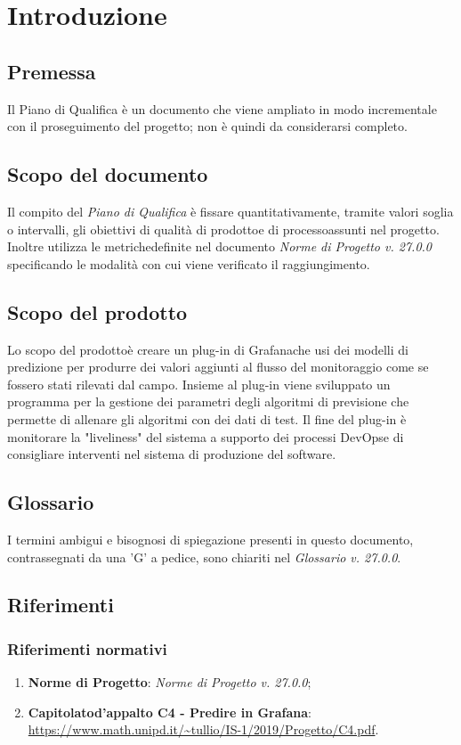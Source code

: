 \section{Introduzione}
	\subsection{Premessa}
	Il Piano di Qualifica è un documento che viene ampliato in modo incrementale con il proseguimento del progetto\glo; non è quindi da considerarsi completo.
	
	\subsection{Scopo del documento}
	Il compito del \textit{Piano di Qualifica} è fissare quantitativamente, tramite valori soglia o intervalli, gli obiettivi di qualità di prodotto\glosp e di processo\glosp assunti nel progetto\glo. Inoltre utilizza le metriche\glosp definite nel documento \textit{Norme di Progetto v. 27.0.0} specificando le modalità con cui viene verificato il raggiungimento.

	\subsection{Scopo del prodotto}
	Lo scopo del prodotto\glosp è creare un plug-in di Grafana\glosp che usi dei modelli di predizione per produrre dei valori aggiunti al flusso del monitoraggio come se fossero stati rilevati dal campo. Insieme al plug-in viene sviluppato un programma per la gestione dei parametri degli algoritmi di previsione che permette di allenare gli algoritmi con dei dati di test. Il fine del plug-in è monitorare la "liveliness" del sistema a supporto dei processi DevOps\glosp e di consigliare interventi nel sistema di produzione del software.
	
	\subsection{Glossario}
	I termini ambigui e bisognosi di spiegazione presenti in questo documento, contrassegnati da una 'G' a pedice, sono chiariti nel \textit{Glossario v. 27.0.0}.
	
	\subsection{Riferimenti}
		\subsubsection{Riferimenti normativi}
		\begin{enumerate}
			\item \textbf{Norme di Progetto}: \textit{Norme di Progetto v. 27.0.0};
			\item \textbf{Capitolato}\glosp \textbf{d'appalto C4 - Predire in Grafana}\glo: \url{https://www.math.unipd.it/~tullio/IS-1/2019/Progetto/C4.pdf}.
		\end{enumerate}
	

